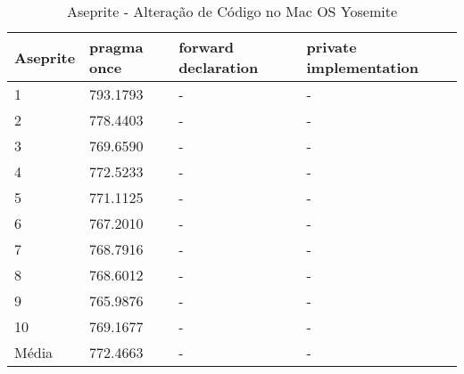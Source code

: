 \begin{table}[!h]
\centering
\caption{Aseprite - Alteração de Código no Mac OS Yosemite }
\label{tab:alteracao_de_codigo:mac:aseprite}
\begin{tabular}{llll}
\textbf{Aseprite} & \textbf{pragma once} & \textbf{forward declaration} & \textbf{private implementation}   \\ \toprule
1                                    &793.1793 &  -   &  -   \\ 
2                                    &778.4403 &  -   &  -   \\ 
3                                    &769.6590 &  -   &  -   \\ 
4                                    &772.5233 &  -   &  -   \\ 
5                                    &771.1125 &  -   &  -   \\ 
6                                    &767.2010 &  -   &  -   \\ 
7                                    &768.7916 &  -   &  -   \\ 
8                                    &768.6012 &  -   &  -   \\ 
9                                    &765.9876 &  -   &  -   \\ 
10                                   &769.1677 &  -   &  -   \\ \bottomrule
Média                                &772.4663 &  -   &  -   \\ 
\end{tabular}
\end{table}

